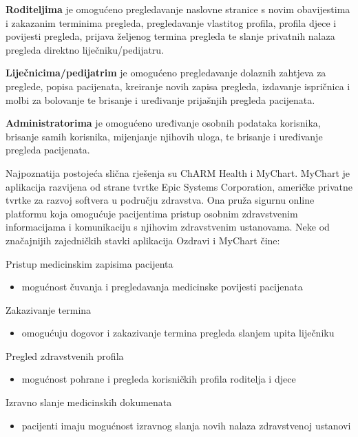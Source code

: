 			\textbf{Roditeljima} je omogućeno pregledavanje naslovne stranice s novim obavijestima i zakazanim terminima pregleda, pregledavanje vlastitog profila, profila djece i povijesti pregleda, prijava željenog termina pregleda te slanje privatnih nalaza pregleda direktno liječniku/pedijatru.
		
		\textbf{Liječnicima/pedijatrim} je omogućeno pregledavanje dolaznih zahtjeva za preglede, popisa pacijenata, kreiranje novih zapisa pregleda, izdavanje ispričnica i molbi za bolovanje te brisanje i uređivanje prijašnjih pregleda pacijenata.
		
			\textbf{Administratorima} je omogućeno uređivanje osobnih podataka korisnika, brisanje samih korisnika, mijenjanje njihovih uloga, te brisanje i uređivanje pregleda pacijenata.
		
		Najpoznatija postojeća slična rješenja su ChARM Health i MyChart. MyChart je aplikacija razvijena od strane tvrtke Epic Systems Corporation, američke privatne tvrtke za razvoj softvera u području zdravstva. Ona pruža sigurnu online platformu koja omogućuje pacijentima pristup osobnim zdravstvenim informacijama i komunikaciju s njihovim zdravstvenim ustanovama. Neke od značajnijih zajedničkih stavki aplikacija Ozdravi i MyChart čine:
		
		\begin{packed_enum}
			\item Pristup medicinskim zapisima pacijenta
			\begin{itemize}
				\item mogućnost čuvanja i pregledavanja medicinske povijesti pacijenata
			\end{itemize}
			\item Zakazivanje termina
				\begin{itemize}
				\item omogućuju dogovor i zakazivanje termina pregleda slanjem upita liječniku
			\end{itemize}
			\item Pregled zdravstvenih profila
			\begin{itemize}
				\item mogućnost pohrane i pregleda korisničkih profila roditelja i djece
			\end{itemize}
			\item Izravno slanje medicinskih dokumenata
			\begin{itemize}
				\item pacijenti imaju mogućnost izravnog slanja novih nalaza zdravstvenoj ustanovi
			\end{itemize}
		\end{packed_enum}
		
